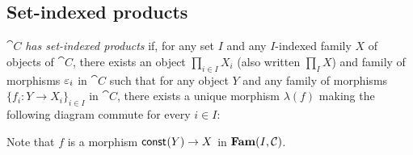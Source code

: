 \subsection{Set-indexed products}
\label{sec:set-indexed-product}

$\cat{C}$ \emph{has set-indexed products} if, for any set $I$ and any $I$-indexed family $X$ of objects of
$\cat{C}$, there exists an object $\prod_{i \in I}X_i$ (also written $\prod_{I} X$) and family of morphisms
$\varepsilon_i$ in $\cat{C}$ such that for any object $Y$ and any family of morphisms $\{f_i: Y \to X_i\}_{i \in I}$
in $\cat{C}$, there exists a unique morphism $\lambda(f)$ making the following diagram commute for every $i
\in I$:

\begin{center}
\end{center}

Note that $f$ is a morphism $\mathsf{const}_{}(Y) \to X$ in $\mathbf{Fam}(I,\mathcal{C})$.
